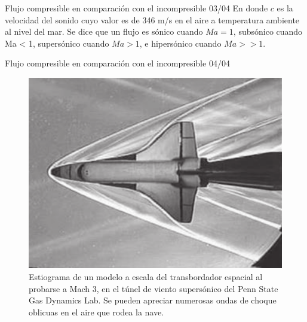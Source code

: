 \begin{frame}{Flujo compresible en comparación con el incompresible 03/04}
\justifying
En donde $c$ es la velocidad del sonido cuyo valor es de 346 m/s en el aire a temperatura ambiente al nivel del mar. Se dice que un flujo es sónico cuando $Ma = 1$, subsónico cuando Ma < 1, supersónico cuando $Ma > 1$, e hipersónico cuando $Ma >> 1$.
\end{frame}
	
	
\begin{frame}{Flujo compresible en comparación con el incompresible 04/04}
\justifying
\begin{figure}[H]
\centering
\includegraphics[scale=0.2]{Section_Files/imagenes/sec01_0101_Fig01-19.png}
\caption{Estiograma de un modelo a escala del transbordador espacial al probarse a Mach 3, en el túnel de viento supersónico del Penn State Gas Dynamics Lab. Se pueden apreciar numerosas ondas de choque oblicuas en el aire que rodea la nave.}
\label{fig: Figura1-19}
\end{figure}
\end{frame}
	
